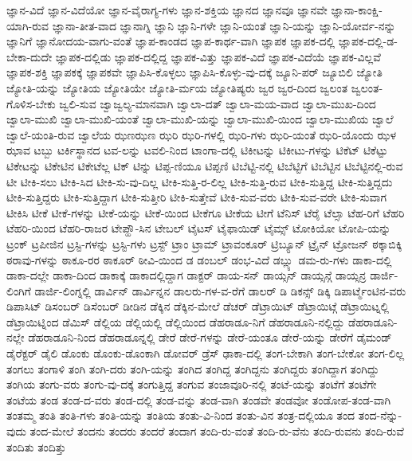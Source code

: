 {ಜ್ಞಾನ-ವಿದೆ
ಜ್ಞಾನ-ವಿದೆಯೋ
ಜ್ಞಾನ-ವೈರಾಗ್ಯ-ಗಳು
ಜ್ಞಾನ-ಶಕ್ತಿಯ
ಜ್ಞಾನದ
ಜ್ಞಾನವೂ
ಜ್ಞಾನವೇ
ಜ್ಞಾನಾ-ಕಾಂಕ್ಷಿ-ಯಾಗಿ-ರುವ
ಜ್ಞಾನಾ-ತೀತ-ವಾದ
ಜ್ಞಾನಾಗ್ನಿ
ಜ್ಞಾನಿ
ಜ್ಞಾನಿ-ಗಳೇ
ಜ್ಞಾನಿ-ಯಂತೆ
ಜ್ಞಾನಿ-ಯನ್ನು
ಜ್ಞಾನಿ-ಯೋರ್ವ-ನನ್ನು
ಜ್ಞಾನಿಗೆ
ಜ್ಞಾನೋದಯ-ವಾಗು-ವಂತೆ
ಜ್ಞಾಪ-ಕಾಂಡದ
ಜ್ಞಾಪ-ಕಾರ್ಥ-ವಾಗಿ
ಜ್ಞಾಪಕ
ಜ್ಞಾಪಕ-ದಲ್ಲಿ
ಜ್ಞಾಪಕ-ದಲ್ಲಿ-ಡ-ಬೇಕಾ-ದುದೇ
ಜ್ಞಾಪಕ-ದಲ್ಲಿಡು
ಜ್ಞಾಪಕ-ದಲ್ಲಿದ್ದ
ಜ್ಞಾಪಕ-ವಿತ್ತು
ಜ್ಞಾಪಕ-ವಿದೆ
ಜ್ಞಾಪಕ-ವಿದೆಯೆ
ಜ್ಞಾಪಕ-ವಿಲ್ಲವೆ
ಜ್ಞಾಪಕ-ಶಕ್ತಿ
ಜ್ಞಾಪಕಕ್ಕೆ
ಜ್ಞಾಪಕವೇ
ಜ್ಞಾಪಿಸಿ-ಕೊಳ್ಳಲು
ಜ್ಞಾಪಿಸಿ-ಕೊಳ್ಳು-ವು-ದಕ್ಕೆ
ಜ್ಯೂನಿ-ಪರ್
ಜ್ಯೂಬಿಲಿ
ಜ್ಯೋತಿ
ಜ್ಯೋತಿ-ಯನ್ನು
ಜ್ಯೋತಿಯ
ಜ್ಯೋತಿಯೇ
ಜ್ಯೋತಿ-ರ್ಮಯ
ಜ್ಯೋತಿಷ್ಯರು
ಜ್ವರ
ಜ್ವರ-ದಿಂದ
ಜ್ವಲಂತ
ಜ್ವಲಂತ-ಗೊಳಿಸ-ಬೇಕು
ಜ್ವಲಿ-ಸುವ
ಜ್ವಾಜ್ವಲ್ಯ-ಮಾನವಾಗಿ
ಜ್ವಾಲಾ-ದತ್
ಜ್ವಾಲಾ-ಮಯ-ವಾದ
ಜ್ವಾಲಾ-ಮುಖ-ದಿಂದ
ಜ್ವಾಲಾ-ಮುಖಿ
ಜ್ವಾಲಾ-ಮುಖಿ-ಯಂತೆ
ಜ್ವಾಲಾ-ಮುಖಿ-ಯನ್ನು
ಜ್ವಾಲಾ-ಮುಖಿ-ಯಿಂದ
ಜ್ವಾಲಾ-ಮುಖಿಯ
ಜ್ವಾಲೆ
ಜ್ವಾಲೆ-ಯಂತಿ-ರುವ
ಜ್ವಾಲೆಯ
ಝಣಝಣ
ಝರಿ
ಝರಿ-ಗಳಲ್ಲಿ
ಝರಿ-ಗಳು
ಝರಿ-ಯಂತೆ
ಝರಿ-ಯೊಂದು
ಝಳ
ಝಾವ
ಟಬ್ಬು
ಟರ್ಕಿಸ್ಥಾನದ
ಟವ-ಲನ್ನು
ಟವಲಿ-ನಿಂದ
ಟಾಂಗಾ-ದಲ್ಲಿ
ಟಿಕೀಟನ್ನು
ಟಿಕೀಟು-ಗಳನ್ನು
ಟಿಕೆಟ್
ಟಿಕೆಟ್ಟು
ಟಿಕೇಟನ್ನು
ಟಿಕೇಟಿನ
ಟಿಕೇಟೆಲ್ಲ
ಟಿಕ್
ಟಿನ್ನು
ಟಿಪ್ಪ-ಣಿಯೂ
ಟಿಪ್ಪಣಿ
ಟಿಬೆಟ್ಟಿ-ನಲ್ಲಿ
ಟಿಬೆಟ್ಟಿಗೆ
ಟಿಬೆಟ್ಟಿನ
ಟಿಬೆಟ್ಟಿನಲ್ಲಿ-ರುವ
ಟೀ
ಟೀಕಿ-ಸಲು
ಟೀಕಿ-ಸಿದ
ಟೀಕಿ-ಸು-ವು-ದಿಲ್ಲ
ಟೀಕಿ-ಸುತ್ತಿ-ರ-ಲಿಲ್ಲ
ಟೀಕಿ-ಸುತ್ತಿ-ರುವ
ಟೀಕಿ-ಸುತ್ತಿದ್ದ
ಟೀಕಿ-ಸುತ್ತಿದ್ದದು
ಟೀಕಿ-ಸುತ್ತಿದ್ದರು
ಟೀಕಿ-ಸುತ್ತಿದ್ದಾಗ
ಟೀಕಿ-ಸುತ್ತೀರಿ
ಟೀಕಿ-ಸುತ್ತೇವೆ
ಟೀಕಿ-ಸುವ-ವರು
ಟೀಕಿ-ಸುವ-ವರೇ
ಟೀಕಿ-ಸುವಾಗ
ಟೀಕಿಸಿ
ಟೀಕೆ
ಟೀಕೆ-ಗಳನ್ನು
ಟೀಕೆ-ಯನ್ನು
ಟೀಕೆ-ಯಿಂದ
ಟೀಕೆಗೂ
ಟೀಕೆಯ
ಟೀಗೆ
ಟೆನಿಸ್
ಟೆರೈ
ಟೆಲ್ಸಾ
ಟೆಹ-ರಿಗೆ
ಟೆಹರಿ
ಟೆಹರಿ-ಯಿಂದ
ಟೆಹರಿ-ರಾಜರ
ಟೇಪ್ಹೌ-ಸಿನ
ಟೇಬಲ್
ಟೈಟಸ್
ಟೈಫಾಯಿಡ್
ಟೈಮ್ಸ್
ಟೋಕಿಯೋ
ಟೋಪಿ-ಯನ್ನು
ಟ್ರಂಕ್
ಟ್ರಪೀಜಿನ
ಟ್ರಸ್ಟಿ-ಗಳನ್ನು
ಟ್ರಸ್ಟಿ-ಗಳು
ಟ್ರಸ್ಟ್
ಟ್ರಾಂ
ಟ್ರಾಮ್
ಟ್ರಾವಂಕೂರ್
ಟ್ರಿಬ್ಯೂನ್
ಟ್ರೈನ್
ಟ್ರೋಜನ್
ಠಕ್ಕಾಬಿಕ್ಕಿ
ಠರಾವು-ಗಳನ್ನು
ಠಾಕೂ-ರರ
ಠಾಕೂರ್
ಠೀವಿ-ಯಿಂದ
ಡ
ಡಂಬಲ್
ಡಂಭ-ವಿದೆ
ಡಬ್ಲ್ಯು
ಡಮ-ರು-ಗಳು
ಡಾಕಾ-ದಲ್ಲಿ
ಡಾಕಾ-ದಲ್ಲೇ
ಡಾಕಾ-ದಿಂದ
ಡಾಕಾಕ್ಕೆ
ಡಾಕಾದಲ್ಲಿದ್ದಾಗ
ಡಾಕ್ಟರ್
ಡಾಯ-ಸನ್
ಡಾಯ್ಸನ್
ಡಾಯ್ಸನ್ಗೆ
ಡಾಯ್ಸನ್ರ
ಡಾರ್ಜಿ-ಲಿಂಗಿಗೆ
ಡಾರ್ಜಿ-ಲಿಂಗ್ನಲ್ಲಿ
ಡಾರ್ವಿನ್
ಡಾರ್ವಿನ್ನನ
ಡಾಲರು-ಗಳ-ವ-ರೆಗೆ
ಡಾಲರ್
ಡಿ
ಡಿಕನ್ಸ್
ಡಿಕ್ಕಿ
ಡಿಪಾರ್ಟ್ಮೆಂಟಿನ-ವರು
ಡಿಪಾಸಿಟ್
ಡಿಸಂಬರ್
ಡಿಸೆಂಬರ್
ಡೀಡಿನ
ಡೆಕ್ಕಿನ
ಡೆಕ್ಕಿನ-ಮೇಲೆ
ಡೆಚರ್
ಡೆಟ್ರಾಯಿಟ್
ಡೆಟ್ರಾಯಿಟ್ಗೆ
ಡೆಟ್ರಾಯಿಟ್ನಲ್ಲಿ
ಡೆಟ್ರಾಯಿಟ್ನಿಂದ
ಡೆಮಿಸ್
ಡೆಲ್ಲಿಯ
ಡೆಲ್ಲಿಯಲ್ಲಿ
ಡೆಲ್ಲಿಯಿಂದ
ಡೆಹರಾಡೂ-ನಿಗೆ
ಡೆಹರಾಡೂನಿ-ನಲ್ಲಿದ್ದು
ಡೆಹರಾಡೂನಿ-ನಲ್ಲೇ
ಡೆಹರಾಡೂನಿ-ನಿಂದ
ಡೆಹರಾಡೂನ್ನಲ್ಲಿ
ಡೇರೆ
ಡೇರೆ-ಗಳನ್ನು
ಡೇರೆ-ಯಂತೂ
ಡೇರೆ-ಯನ್ನು
ಡೇರೆಗೆ
ಡೈಮಂಡ್
ಡೈರೆಕ್ಟರ್
ಡೈಲಿ
ಡೊಂಕು
ಡೊಂಕು-ಡೊಂಕಾಗಿ
ಡೋವರ್
ಡ್ರೆಸ್
ಢಾಕಾ-ದಲ್ಲಿ
ತಂಗ-ಬೇಕಾಗಿ
ತಂಗ-ಬೇಕೋ
ತಂಗ-ಲಿಲ್ಲ
ತಂಗಲು
ತಂಗಾಳಿ
ತಂಗಿ
ತಂಗಿ-ದರು
ತಂಗಿ-ಯನ್ನು
ತಂಗಿದ
ತಂಗಿದ್ದ
ತಂಗಿದ್ದನು
ತಂಗಿದ್ದರು
ತಂಗಿದ್ದಾಗ
ತಂಗಿದ್ದು
ತಂಗಿಯ
ತಂಗು-ವರು
ತಂಗು-ವು-ದಕ್ಕೆ
ತಂಗುತ್ತಿದ್ದ
ತಂಗುವ
ತಂಜಾವೂರಿ-ನಲ್ಲಿ
ತಂಟೆ-ಯನ್ನು
ತಂಟೆಗೆ
ತಂಟೆಗೇ
ತಂಟೆಯ
ತಂಡ
ತಂಡ-ದ-ವರು
ತಂಡ-ದಲ್ಲಿ
ತಂಡ-ವನ್ನು
ತಂಡ-ವಾಗಿ
ತಂಡವೇ
ತಂಡವೋ
ತಂಡೋಪ-ತಂಡ-ವಾಗಿ
ತಂತಮ್ಮ
ತಂತಿ
ತಂತಿ-ಗಳು
ತಂತಿ-ಯನ್ನು
ತಂತಿಯ
ತಂತು-ವಿ-ನಿಂದ
ತಂತು-ವಿನ
ತಂತ್ರ-ದಲ್ಲಿಯೂ
ತಂದ
ತಂದ-ನೆನ್ನು-ವುದು
ತಂದ-ಮೇಲೆ
ತಂದನು
ತಂದರು
ತಂದರೆ
ತಂದಾಗ
ತಂದಿ-ರು-ವಂತೆ
ತಂದಿ-ರು-ವೆನು
ತಂದಿ-ರುವನು
ತಂದಿ-ರುವೆ
ತಂದಿತು
ತಂದಿತ್ತು
}
